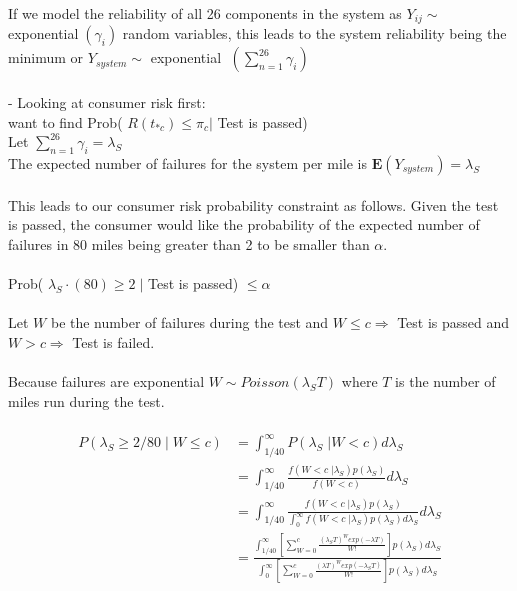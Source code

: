 \documentclass{article}
\begin{document}
\noindent
If we model the reliability of all 26 components in the system as $Y_{ij} \sim$ exponential$\;(\gamma_i) $ random variables, this leads to the system reliability being the minimum or $Y_{system} \sim $ exponential $ \;(\sum_{n = 1}^{26} \gamma_i) $
\\
\\
- Looking at consumer risk first:
\\
want to find Prob( $ R(t_{*c}) \leq \pi_c \vert $ Test is passed)
\\
Let $ \sum_{n = 1}^{26} \gamma_i = \lambda_S $
\\
The expected number of failures for the system per mile is $ \mathbf{E}(Y_{system}) = \lambda_S $
\\
\\
This leads to our consumer risk probability constraint as follows.  Given the test is passed, the consumer would like the probability of the expected number of failures in 80 miles being greater than 2 to be smaller than $\alpha$.
\\
\\
Prob( $ \lambda_S \cdot (80) \geq 2 \; \vert $ Test is passed) $ \leq \alpha $
\\
\\
Let $ W $ be the number of failures during the test and $ W \leq c \Rightarrow $ Test is passed and $ W > c \Rightarrow $ Test is failed.
\\
\\
Because failures are exponential $ W \sim Poisson(\lambda_S T) $ where $ T $ is the number of miles run during the test.
\\
\\
$$
\begin{aligned}
	 P(\lambda_S \geq 2/80 \; \vert \; W \leq c) &= \int_{1/40}^{\infty} P(\lambda_S \; \vert W < c) d\lambda_S \\
     &= \int_{1/40}^{\infty} \frac{f(W < c \; \vert \lambda_S) p(\lambda_S)}{f(W < c)}d\lambda_S\\
     &= \int_{1/40}^{\infty} \frac{f(W < c \; \vert \lambda_S) p(\lambda_S)}{\int_{0}^{\infty} f(W < c \; \vert \lambda_S) p(\lambda_S) d\lambda_S}d\lambda_S \\
     &= \frac{\int_{1/40}^{\infty} [ \sum_{W=0}^c \frac{(\lambda_S T)^W exp(-\lambda T)}{W!}]p(\lambda_S)d\lambda_S} {\int_{0}^{\infty} [ \sum_{W=0}^c \frac{(\lambda T)^W exp(-\lambda_S T)}{W!}]p(\lambda_S)d\lambda_S}
\end{aligned}
$$
\\
\\
\end{document}
